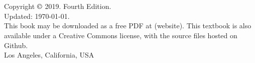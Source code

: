 \chapter{}
\vfill

\noindent%
Copyright $\copyright$ 2019. Fourth Edition. \\
Updated: \today. \\

\noindent%
This book may be downloaded as a free PDF at
(website).
This textbook is also available under a
{Creative Commons license},
with the source files hosted on {Github}. \\

Los Angeles, California, USA




